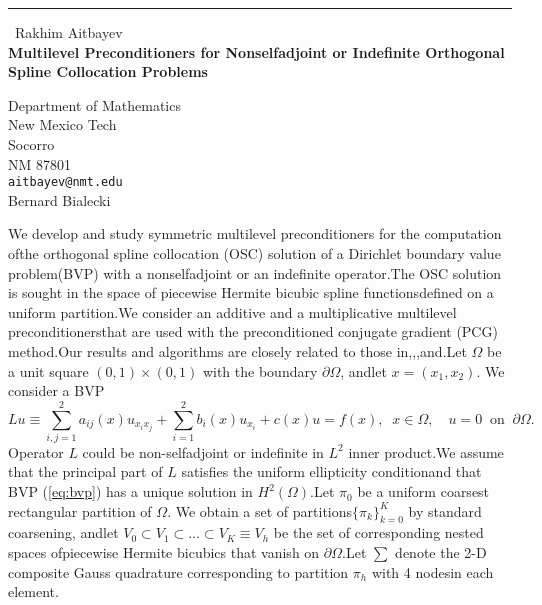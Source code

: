 \documentclass{report}
\begin{document}
\begin{center}
\rule{6in}{1pt} \
{\large Rakhim Aitbayev \\
{\bf Multilevel Preconditioners for Nonselfadjoint or Indefinite Orthogonal Spline Collocation Problems}}

Department of Mathematics \\ New Mexico Tech \\ Socorro \\ NM 87801
\\
{\tt aitbayev@nmt.edu}\\
Bernard Bialecki\end{center}

\newtheorem*{theorem}{Theorem}\newcommand{\GP}{\mbox{${\cal G}$}}\newcommand{\SH}{\mbox{$\scriptscriptstyle H^{2}(\Omega)$}}\newcommand{\SL}{\mbox{$\scriptscriptstyle L^{2}(\Omega)$}}We develop and study symmetric multilevel preconditioners for the computation ofthe orthogonal spline collocation (OSC) solution of a Dirichlet boundary value problem(BVP) with a nonselfadjoint or an indefinite operator.The OSC solution is sought in the space of piecewise Hermite bicubic spline functionsdefined on a uniform partition.We consider an additive and a multiplicative multilevel preconditionersthat are used with the preconditioned conjugate gradient (PCG) method.Our results and algorithms are closely related to those in\cite{Aitbayev_Bialecki_2003},\cite{Bialecki_1998},\cite{Bialecki_Dryja_1997},and\cite{SBG_1996}.Let $\Omega$ be a unit square $(0,1)\times(0,1)$ with the boundary $\partial\Omega$,
andlet $x=(x_1,x_2)$.
We consider a BVP\begin{equation}\label{eq:bvp}Lu\equiv\sum_{i,j=1}^{2} a_{ij}(x)u_{x_ix_j}+\sum_{i=1}^{2} b_i(x) u_{x_i}+c(x)u = f(x),\;\;x\in\Omega,\quad u=0 \;\;\mbox{on}\;\;\partial\Omega.\end{equation}Operator $L$ could be non-selfadjoint or indefinite in $L^2$ inner product.We assume that the principal part of $L$ satisfies the uniform ellipticity conditionand that BVP (\ref{eq:bvp}) has a unique solution in $H^2(\Omega)$.Let $\pi_0$ be a uniform coarsest rectangular partition of $\Omega$.
We obtain a set of partitions$\{\pi_k\}_{k=0}^{K}$ by standard coarsening,
andlet $V_0\subset V_1\subset\ldots\subset V_K\equiv V_h$ be the set of corresponding nested spaces ofpiecewise Hermite bicubics that vanish on $\partial\Omega$.Let $\sum$ denote the 2-D composite Gauss quadrature corresponding to partition $\pi_h$ with 4 nodesin each element.
\end{document}
